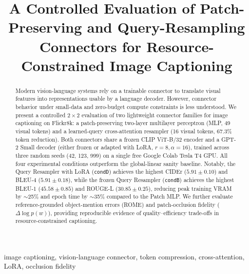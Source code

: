 \documentclass[conference]{IEEEtran}
\begin{document}
\title{A Controlled Evaluation of Patch-Preserving and Query-Resampling Connectors for Resource-Constrained Image Captioning}

\author{
}

\maketitle

\begin{abstract}
Modern vision-language systems rely on a trainable connector to translate visual features into representations usable by a language decoder. However, connector behavior under small-data and zero-budget compute constraints is less understood. We present a controlled $2 \times 2$ evaluation of two lightweight connector families for image captioning on Flickr8k: a patch-preserving two-layer multilayer perceptron (MLP, 49 visual tokens) and a learned-query cross-attention resampler (16 visual tokens, 67.3\% token reduction). Both connectors share a frozen CLIP ViT-B/32 encoder and a GPT-2 Small decoder (either frozen or adapted with LoRA, $r=8, \alpha=16$), trained across three random seeds (42, 123, 999) on a single free Google Colab Tesla T4 GPU. All four experimental conditions outperform the global-linear sanity baseline. Notably, the Query Resampler with LoRA (\texttt{condD}) achieves the highest CIDEr ($5.91 \pm 0.10$) and BLEU-4 ($5.91 \pm 0.18$), while the frozen Query Resampler (\texttt{condB}) achieves the highest BLEU-1 ($45.58 \pm 0.85$) and ROUGE-L ($30.85 \pm 0.25$), reducing peak training VRAM by $\sim$25\% and epoch time by $\sim$35\% compared to the Patch MLP. We further evaluate reference-grounded object-mention errors (ROME) and patch-occlusion fidelity ($\Delta \log p(w)$), providing reproducible evidence of quality--efficiency trade-offs in resource-constrained captioning.
\end{abstract}

\begin{IEEEkeywords}
image captioning, vision-language connector, token compression, cross-attention, LoRA, occlusion fidelity
\end{IEEEkeywords}
\end{document}
